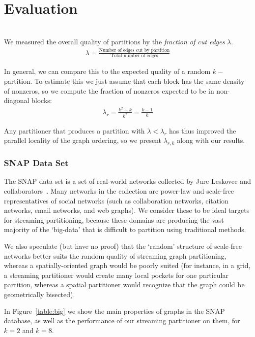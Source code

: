 \section{Evaluation}
\\

We measured the overall quality of partitions by the \textit{fraction of cut edges} $\lambda$.
\begin{align}\lambda = \frac{\text{Number of edges cut by partition}}{\text{Total number of edges}}\end{align}

In general, we can compare this to the expected quality of a random $k-$partition. To estimate this we just assume that each block has the same density of nonzeros, so we compute the fraction of nonzeros expected to be in non-diagonal blocks:
\begin{align}\lambda_r = \frac{k^2 - k}{k^2} = \frac{k-1}{k} \end{align}

Any partitioner that produces a partition with $\lambda < \lambda_r$ has thus improved the parallel locality of the graph ordering, so we present $\lambda_{r,k}$ along with our results.

\subsubsection{SNAP Data Set}
The SNAP data set is a set of real-world networks collected by Jure Leskovec and collaborators~\cite{Leskovec-data}. Many networks in the collection are power-law and scale-free representatives of social networks (such as collaboration networks, citation networks, email networks, and web graphs). We consider these to be ideal targets for streaming partitioning, because these domains are producing the vast majority of the `big-data' that is difficult to partition using traditional methods. 

We also speculate (but have no proof) that the `random' structure of scale-free networks better suits the random quality of streaming graph partitioning, whereas a spatially-oriented graph would be poorly suited (for instance, in a grid, a streaming partitioner would create many local pockets for one particular partition, whereas a spatial partitioner would recognize that the graph could be geometrically bisected). 

In Figure~\ref{table:big} we show the main properties of graphs in the SNAP database, as well as the performance of our streaming partitioner on them, for $k=2$ and $k=8$. 

